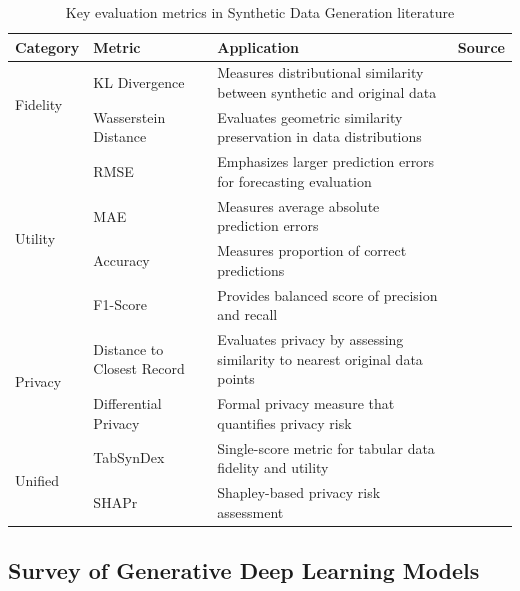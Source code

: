 \documentclass[11pt]{article}
\begin{document}
\begin{table}[H]
\centering
\caption{Key evaluation metrics in Synthetic Data Generation literature}
\label{tab:literature_metrics_comprehensive}
\small
\begin{tabular}{llp{5cm}l}
\toprule
\textbf{Category} & \textbf{Metric} & \textbf{Application} & \textbf{Source} \\
\midrule
\multirow{2}{*}{Fidelity} 
    & KL Divergence & Measures distributional similarity between synthetic and original data & \textcite{li_his-gan_2019} \\
    & Wasserstein Distance & Evaluates geometric similarity preservation in data distributions & \textcite{li_his-gan_2019} \\
\midrule
\multirow{4}{*}{Utility} 
    & RMSE & Emphasizes larger prediction errors for forecasting evaluation & \textcite{Hazra2022-cy} \\
    & MAE & Measures average absolute prediction errors & \textcite{Hazra2022-cy} \\
    & Accuracy & Measures proportion of correct predictions & \textcite{figueira_survey_2022} \\
    & F1-Score & Provides balanced score of precision and recall & \textcite{figueira_survey_2022} \\
\midrule
\multirow{2}{*}{Privacy} 
    & Distance to Closest Record & Evaluates privacy by assessing similarity to nearest original data points & \textcite{mendelevitch_fidelity_2021} \\
    & Differential Privacy & Formal privacy measure that quantifies privacy risk & \textcite{nikolenko_synthetic_2019} \\
\midrule
\multirow{3}{*}{Unified} 
    & TabSynDex & Single-score metric for tabular data fidelity and utility & \textcite{chundawat_tabsyndex_2024} \\
    & SHAPr & Shapley-based privacy risk assessment & \textcite{duddu_shapr_2022} \\
\bottomrule
\end{tabular}
\end{table}


\subsection{Survey of Generative Deep Learning Models}
\end{document}
